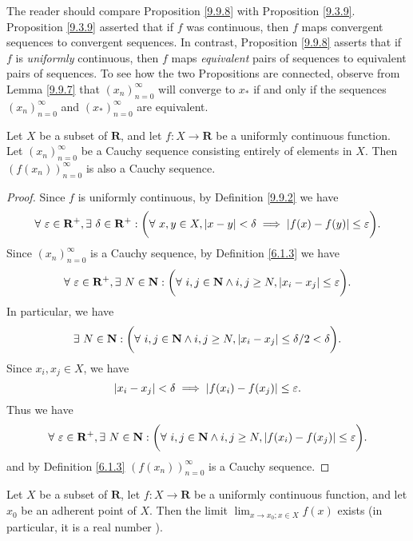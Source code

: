 \begin{remark}\label{9.9.9}
    The reader should compare Proposition \ref{9.9.8} with Proposition \ref{9.3.9}.
    Proposition \ref{9.3.9} asserted that if \(f\) was continuous, then \(f\) maps convergent sequences to convergent sequences.
    In contrast, Proposition \ref{9.9.8} asserts that if \(f\) is \emph{uniformly} continuous, then \(f\) maps \emph{equivalent} pairs of sequences to equivalent pairs of sequences.
    To see how the two Propositions are connected, observe from Lemma \ref{9.9.7} that \((x_n)_{n = 0}^\infty\) will converge to \(x_*\) if and only if the sequences \((x_n)_{n = 0}^\infty\) and \((x_*)_{n = 0}^\infty\) are equivalent.
\end{remark}

\setcounter{theorem}{11}
\begin{proposition}\label{9.9.12}
    Let \(X\) be a subset of \(\mathbf{R}\), and let \(f : X \to \mathbf{R}\) be a uniformly continuous function.
    Let \((x_n)_{n = 0}^\infty\) be a Cauchy sequence consisting entirely of elements in \(X\).
    Then \((f(x_n))_{n = 0}^\infty\) is also a Cauchy sequence.
\end{proposition}

\begin{proof}
    Since \(f\) is uniformly continuous, by Definition \ref{9.9.2} we have
    \[
        \forall\ \varepsilon \in \mathbf{R}^+, \exists\ \delta \in \mathbf{R}^+ : \bigg(\forall\ x, y \in X, \abs*{x - y} < \delta \implies \abs*{f(x) - f(y)} \leq \varepsilon\bigg).
    \]
    Since \((x_n)_{n = 0}^\infty\) is a Cauchy sequence, by Definition \ref{6.1.3} we have
    \[
        \forall\ \varepsilon \in \mathbf{R}^+, \exists\ N \in \mathbf{N} : \bigg(\forall\ i, j \in \mathbf{N} \land i, j \geq N, \abs*{x_i - x_j} \leq \varepsilon\bigg).
    \]
    In particular, we have
    \[
        \exists\ N \in \mathbf{N} : \bigg(\forall\ i, j \in \mathbf{N} \land i, j \geq N, \abs*{x_i - x_j} \leq \delta / 2 < \delta\bigg).
    \]
    Since \(x_i, x_j \in X\), we have
    \[
        \abs*{x_i - x_j} < \delta \implies \abs*{f(x_i) - f(x_j)} \leq \varepsilon.
    \]
    Thus we have
    \[
        \forall\ \varepsilon \in \mathbf{R}^+, \exists\ N \in \mathbf{N} : \bigg(\forall\ i, j \in \mathbf{N} \land i, j \geq N, \abs*{f(x_i) - f(x_j)} \leq \varepsilon\bigg).
    \]
    and by Definition \ref{6.1.3} \((f(x_n))_{n = 0}^\infty\) is a Cauchy sequence.
\end{proof}

\setcounter{theorem}{13}
\begin{corollary}\label{9.9.14}
    Let \(X\) be a subset of \(\mathbf{R}\), let \(f : X \to \mathbf{R}\) be a uniformly continuous function, and let \(x_0\) be an adherent point of \(X\).
    Then the limit \(\lim_{x \to x_0 ; x \in X} f(x)\) exists
    (in particular, it is a real number ).
\end{corollary}

